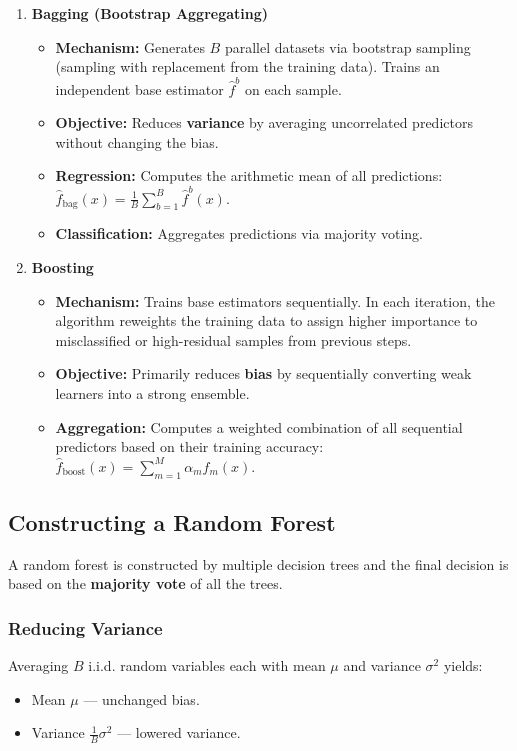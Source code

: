\documentclass{article}
\begin{document}
\begin{enumerate}
  \item \textbf{Bagging (Bootstrap Aggregating)}
  \begin{itemize}
    \item \textbf{Mechanism:} Generates $B$ parallel datasets via bootstrap sampling (sampling with replacement from the training data). Trains an independent base estimator $\hat{f}^b$ on each sample.
    \item \textbf{Objective:} Reduces \textbf{variance} by averaging uncorrelated predictors without changing the bias.
    \item \textbf{Regression:} Computes the arithmetic mean of all predictions: $\hat{f}_{\text{bag}}(x) = \frac{1}{B}\sum_{b=1}^B \hat{f}^b(x)$.
    \item \textbf{Classification:} Aggregates predictions via majority voting.
  \end{itemize}

  \item \textbf{Boosting}
  \begin{itemize}
    \item \textbf{Mechanism:} Trains base estimators sequentially. In each iteration, the algorithm reweights the training data to assign higher importance to misclassified or high-residual samples from previous steps.
    \item \textbf{Objective:} Primarily reduces \textbf{bias} by sequentially converting weak learners into a strong ensemble.
    \item \textbf{Aggregation:} Computes a weighted combination of all sequential predictors based on their training accuracy: $\hat{f}_{\text{boost}}(x) = \sum_{m=1}^M \alpha_m f_m(x)$.
  \end{itemize}
\end{enumerate}

\subsection{Constructing a Random Forest}
A random forest is constructed by multiple decision trees and the final decision is based on the \textbf{majority vote} of all the trees.

\subsubsection{Reducing Variance}
Averaging $B$ i.i.d. random variables each with mean $\mu$ and variance $\sigma^2$ yields:
\begin{itemize}
  \item Mean $\mu$ --- unchanged bias.
  \item Variance $\frac{1}{B}\sigma^2$ --- lowered variance.
\end{itemize}
\end{document}

